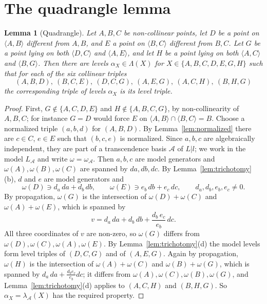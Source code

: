 \documentclass[11pt]{amsart}
\newtheorem{lemma}[theorem]{Lemma}
\theoremstyle{definition}
\theoremstyle{remark}
\newcommand{\la}{\langle}
\newcommand{\ra}{\rangle}
\begin{document}
\section{The quadrangle lemma}\label{sec:quadrangle}

\begin{lemma}[Quadrangle]\label{lem:quadrangle}
Let $A,B,C$ be non-collinear points, let $D$ be a point on $\la A,B\ra$ different from $A,B$, and $E$ a point on $\la B,C\ra$ different from $B,C$.
Let $G$ be a point lying on both $\la D,C\ra$ and $\la A,E\ra$, and let $H$ be a point lying on both $\la A,C\ra$ and $\la B,G\ra$.
Then there are levels $\alpha_X\in\Lambda(X)$ for $X\in\{A,B,C,D,E,G,H\}$ such that for each of the six collinear triples
\[ (A,B,D),\ (B,C,E),\ (D,C,G),\ (A,E,G),\ (A,C,H),\ (B,H,G) \]
the corresponding triple of levels $\alpha_X$ is its level triple.
\end{lemma}

\begin{proof}
First, $G\notin\{A,C,D,E\}$ and $H\notin\{A,B,C,G\}$, by non-collinearity of $A,B,C$; for instance $G=D$ would force $E$ on $\la A,B\ra\cap\la B,C\ra=B$.
Choose a normalized triple $(a,b,d)$ for $(A,B,D)$. By Lemma~\ref{lem:normalized} there are $c\in C$, $e\in E$ such that $(b,c,e)$ is normalized.
Since $a,b,c$ are algebraically independent, they are part of a transcendence basis $\mathcal A$ of $L|l$; we work in the model $L_{\mathcal A}$ and write $\omega=\omega_{\mathcal A}$.
Then $a,b,c$ are model generators and $\omega(A),\omega(B),\omega(C)$ are spanned by $da,db,dc$.
By Lemma~\ref{lem:trichotomy}(b), $d$ and $e$ are model generators and
\[ \omega(D)\ni d_a\,da+d_b\,db,\qquad \omega(E)\ni e_b\,db+e_c\,dc,\qquad d_a,d_b,e_b,e_c\neq0. \]
By propagation, $\omega(G)$ is the intersection of $\omega(D)+\omega(C)$ and $\omega(A)+\omega(E)$, which is spanned by
\[ v=d_a\,da+d_b\,db+\frac{d_b\,e_c}{e_b}\,dc . \]
All three coordinates of $v$ are non-zero, so $\omega(G)$ differs from $\omega(D),\omega(C),\omega(A),\omega(E)$.
By Lemma~\ref{lem:trichotomy}(d) the model levels form level triples of $(D,C,G)$ and of $(A,E,G)$.
Again by propagation, $\omega(H)$ is the intersection of $\omega(A)+\omega(C)$ and $\omega(B)+\omega(G)$, which is spanned by $d_a\,da+\frac{d_be_c}{e_b}dc$;
it differs from $\omega(A),\omega(C),\omega(B),\omega(G)$, and Lemma~\ref{lem:trichotomy}(d) applies to $(A,C,H)$ and $(B,H,G)$.
So $\alpha_X=\lambda_{\mathcal A}(X)$ has the required property.
\end{proof}
\end{document}
